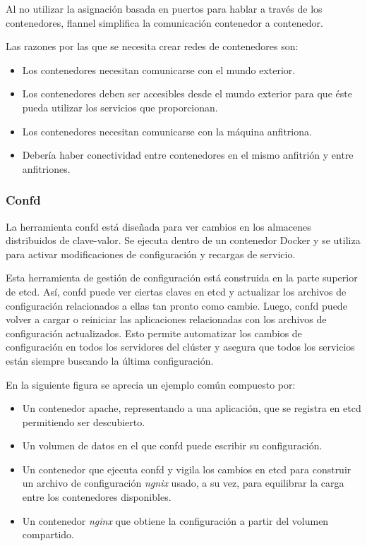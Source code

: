 Al no utilizar la asignación basada en puertos para hablar a través de los contenedores, flannel simplifica la comunicación contenedor a contenedor.

Las razones por las que se necesita crear redes de contenedores son:
\begin{itemize}
\item Los contenedores necesitan comunicarse con el mundo exterior.
\item Los contenedores deben ser accesibles desde el mundo exterior para que éste pueda utilizar los servicios que proporcionan.
\item Los contenedores necesitan comunicarse con la máquina anfitriona.
\item Debería haber conectividad entre contenedores en el mismo anfitrión y entre anfitriones.
\end{itemize}

\subsubsection{Confd}

La herramienta confd está diseñada para ver cambios en los almacenes distribuidos de clave-valor. Se ejecuta dentro de un contenedor Docker y se utiliza para activar modificaciones de configuración y recargas de servicio.

Esta herramienta de gestión de configuración está construida en la parte superior de etcd. Así, confd puede ver ciertas claves en etcd y actualizar los archivos de configuración relacionados a ellas tan pronto como cambie. Luego, confd puede volver a cargar o reiniciar las aplicaciones relacionadas con los archivos de configuración actualizados. Esto permite automatizar los cambios de configuración en todos los servidores del clúster y asegura que todos los servicios están siempre buscando la última configuración.

En la siguiente figura se aprecia un ejemplo común compuesto por: 
\begin{itemize}
\item Un contenedor apache, representando a una aplicación, que se registra en etcd permitiendo ser descubierto. 
\item Un volumen de datos en el que confd puede escribir su configuración.
\item Un contenedor que ejecuta confd y vigila los cambios en etcd para construir un archivo de configuración \textit{ngnix} usado, a su vez, para equilibrar la carga entre los contenedores disponibles.
\item Un contenedor \textit{nginx} que obtiene la configuración a partir del volumen compartido.
\end{itemize}

